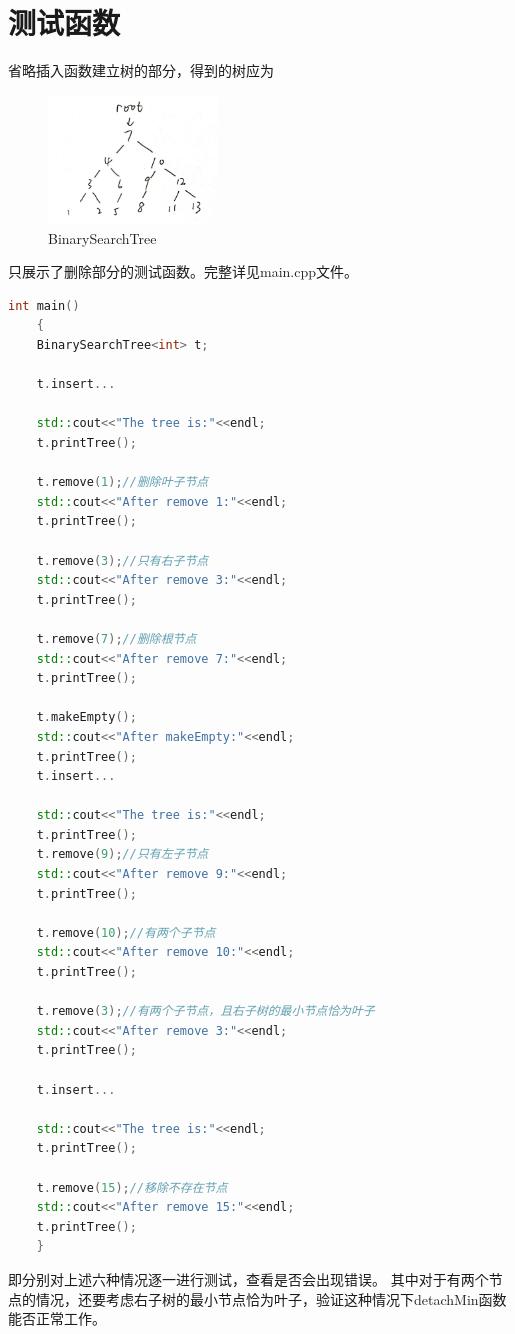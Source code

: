 \documentclass[UTF8]{ctexart}
\begin{document}
\section{测试函数}
省略插入函数建立树的部分，得到的树应为
\begin{figure}[H]
    \centering
    \includegraphics[width=0.4\textwidth]{tree.jpg}
    \caption{BinarySearchTree}
    \label{fig:BinarySearchTree}
\end{figure}
只展示了删除部分的测试函数。完整详见main.cpp文件。
\begin{lstlisting}[language=C++]
    int main()
    {
    BinarySearchTree<int> t;

    t.insert...

    std::cout<<"The tree is:"<<endl;
    t.printTree();

    t.remove(1);//删除叶子节点
    std::cout<<"After remove 1:"<<endl;
    t.printTree();

    t.remove(3);//只有右子节点
    std::cout<<"After remove 3:"<<endl;
    t.printTree();

    t.remove(7);//删除根节点
    std::cout<<"After remove 7:"<<endl;
    t.printTree();

    t.makeEmpty();
    std::cout<<"After makeEmpty:"<<endl;
    t.printTree();
    t.insert...

    std::cout<<"The tree is:"<<endl;
    t.printTree();
    t.remove(9);//只有左子节点
    std::cout<<"After remove 9:"<<endl;
    t.printTree();

    t.remove(10);//有两个子节点
    std::cout<<"After remove 10:"<<endl;
    t.printTree();

    t.remove(3);//有两个子节点，且右子树的最小节点恰为叶子
    std::cout<<"After remove 3:"<<endl;
    t.printTree();
    
    t.insert...

    std::cout<<"The tree is:"<<endl;
    t.printTree();

    t.remove(15);//移除不存在节点
    std::cout<<"After remove 15:"<<endl;
    t.printTree();
    }
\end{lstlisting}
    即分别对上述六种情况逐一进行测试，查看是否会出现错误。
    其中对于有两个节点的情况，还要考虑右子树的最小节点恰为叶子，验证这种情况下detachMin函数能否正常工作。
\end{document}
